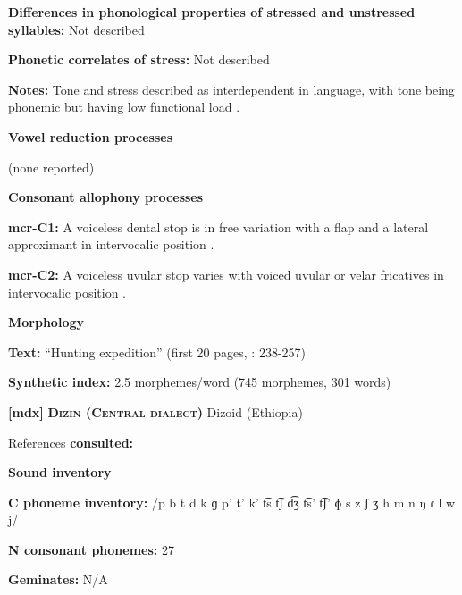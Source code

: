 \textbf{Differences in phonological properties of stressed and unstressed syllables:} Not described



\textbf{Phonetic correlates of stress:} Not described



\textbf{Notes:} Tone and stress described as interdependent in language, with tone being phonemic but having low functional load \citep[226]{Whitehead2004}. 



\textbf{Vowel reduction processes}



(none reported)



\textbf{Consonant allophony processes}



\textbf{mcr-C1:} A voiceless dental stop is in free variation with a flap and a lateral approximant in intervocalic position \citep[9]{Whitehead2004}.



\textbf{mcr-C2:} A voiceless uvular stop varies with voiced uvular or velar fricatives in intervocalic position \citep[9]{Whitehead2004}.



\textbf{Morphology}



\textbf{Text:} “Hunting expedition” (first 20 pages, \citealt{Whitehead2004}: 238-257)



\textbf{Synthetic index:} 2.5 morphemes/word (745 morphemes, 301 words)



\textbf{[mdx]}   \textbf{\textsc{Dizin (Central dialect)}}  Dizoid (Ethiopia)



References \textbf{consulted:} \citet{Allan1976,Beachy2005,Breeze1988}



\textbf{Sound inventory}



\textbf{C phoneme inventory:} /p b t d k ɡ p’ t’ k’ t͡s t͡ʃ d͡ʒ t͡s’ t͡ʃ’ ɸ s z ʃ ʒ h m n ŋ ɾ l w j/



\textbf{N consonant phonemes:} 27



\textbf{Geminates:} N/A



